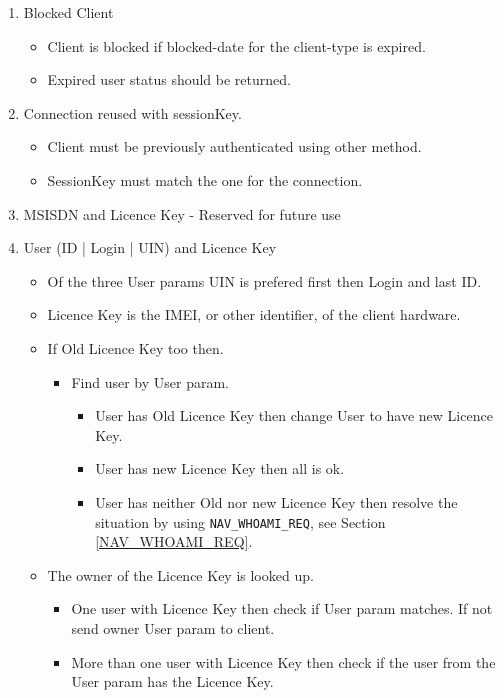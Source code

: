 \begin{enumerate}

\item Blocked Client
  \begin{itemize}
    \item Client is blocked if blocked-date for the client-type is expired.
    \item Expired user status should be returned.
  \end{itemize}
\item Connection reused with sessionKey.
  \begin{itemize}
    \item Client must be previously authenticated using other method.
    \item SessionKey must match the one for the connection.
  \end{itemize}
\item MSISDN and Licence Key - Reserved for future use
\item User (ID | Login | UIN) and Licence Key
  \begin{itemize}
  \item Of the three User params UIN is prefered first then Login and last 
    ID.
  \item Licence Key is the IMEI, or other identifier, of the client hardware.
  \item If Old Licence Key too then.
    \begin{itemize}
    \item Find user by User param.
      \begin{itemize}
      \item User has Old Licence Key then change User to have new Licence Key.
      \item User has new Licence Key then all is ok.
      \item User has neither Old nor new Licence Key then resolve the
        situation by using {\tt NAV\_WHOAMI\_REQ}, see Section
        \ref{NAV_WHOAMI_REQ}.
      \end{itemize}
    \end{itemize}
  \item The owner of the Licence Key is looked up.
    \begin{itemize}
    \item One user with Licence Key then check if User param matches.
      If not send owner User param to client.
    \item More than one user with Licence Key then check if the user
      from the User param has the Licence Key.

\end{itemize}
\end{itemize}
\end{enumerate}
